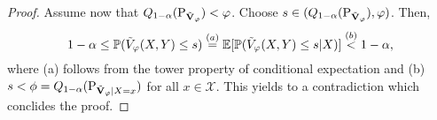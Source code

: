 \begin{proof}
  Assume now that $Q_{1-\alpha}(\textup{P}_{\tilde{\mathbf{V}}_\varphi})<  \varphi$. Choose $s \in (Q_{1-\alpha}(\textup{P}_{\tilde{\mathbf{V}}_\varphi}), \varphi)$. Then,
  \[
    1-\alpha \leq \mathbb{P}( \tilde{V}_\varphi(X,Y) \leq s) \stackrel{(a)}{=} \mathbb{E}[\mathbb{P}(\tilde{V}_\varphi(X,Y) \leq s|X)] \stackrel{(b)}{<}1-\alpha,
  \]
  where (a) follows from the tower property of conditional expectation and (b) $s < \phi= Q_{1-\alpha}(\textup{P}_{\tilde{\mathbf{V}}_\varphi|X=x})$ for all $x \in \mathcal{X}$. This yields to a contradiction which conclides the proof.
\end{proof}